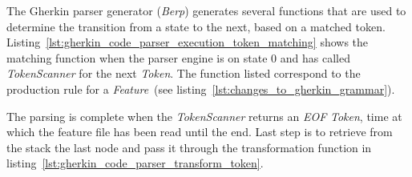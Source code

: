 \documentclass[dissertation,final]{softeng}
\begin{document}
The Gherkin parser generator (\emph{Berp}) generates several functions that are used to determine the transition from a state to the next, based on a matched token. Listing~\ref{lst:gherkin_code_parser_execution_token_matching} shows the matching function when the parser engine is on state $0$ and has called \emph{TokenScanner} for the next \emph{Token}. The function listed correspond to the production rule for a \emph{Feature}~(see listing~\ref{lst:changes_to_gherkin_grammar}).

The parsing is complete when the \emph{TokenScanner} returns an \emph{EOF} \emph{Token}, time at which the feature file has been read until the end. Last step is to retrieve from the stack the last node and pass it through the transformation function in listing~\ref{lst:gherkin_code_parser_transform_token}.
\end{document}
